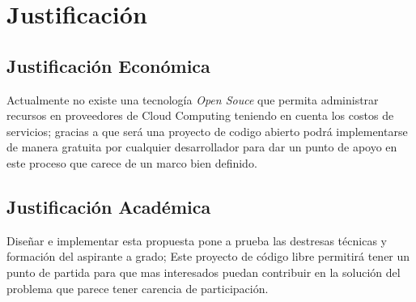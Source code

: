 \chapter{Justificación} %

\label{ch:justificacion} %


\section{Justificación Económica}
Actualmente no existe una tecnología \textit{Open Souce} que permita administrar recursos en proveedores de Cloud Computing teniendo en cuenta los costos de servicios; gracias a que \appName será una proyecto de codigo abierto podrá implementarse de manera gratuita por cualquier desarrollador para dar un punto de apoyo en este proceso que carece de un marco bien definido.\bigskip

\section{Justificación Académica}
Diseñar e implementar esta propuesta pone a prueba las destresas técnicas y formación del aspirante a grado; Este proyecto de código libre permitirá tener un punto de partida para que mas interesados puedan contribuir en la solución del problema que parece tener carencia de participación. 

